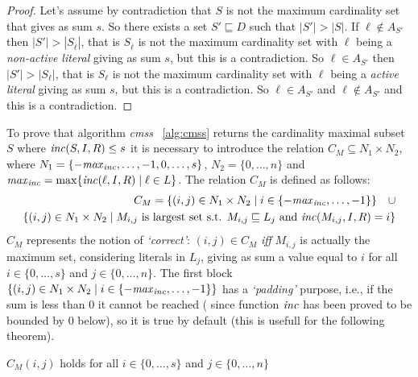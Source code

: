 \begin{proof}
    Let's assume by contradiction that $S$ is not the maximum cardinality set that gives as sum $s$.
    So there exists a set $S' \sqsubseteq D$ such that $|S'| > |S|$.
    If $\ell \not\in A_{S'}$ then $|S'| > |S_{\overline{\ell}}|$, that is $S_{\overline{\ell}}$ 
    is not the maximum cardinality set 
    with $\ell$ being a \textit{non-active literal} giving as sum $s$, but this is a contradiction.
    So $\ell \in A_{S'}$ then $|S'| > |S_{\ell}|$, that is $S_{\ell}$ is not the maximum cardinality set 
    with $\ell$ being a \textit{active literal} giving as sum $s$, but this is a contradiction.
    So $\ell \in A_{S'}$ and $ \ell \not\in A_{S'}$ and this is a contradiction.
\end{proof}



To prove that algorithm \textit{cmss} ~\ref{alg:cmss} returns the cardinality maximal subset $S$ 
where  $\mathit{inc}(S,I,R) \le s$ it is necessary to introduce the
relation $C_M \subseteq N_1 \times N_2$, where $N_1 = \{-\mathit{max}_{\mathit{inc}}, \hdots, -1, 0, \hdots, s\}$,
$N_2 = \{0, \hdots, n\}$ and $\mathit{max}_{\mathit{inc}} = \max \{ \mathit{inc}(\ell,I,R) \mid \ell \in L\}$.
The relation $C_M$ is defined as follows:
\begin{align*}
    C_M = \{ (i,j) \in N_1 \times N_2 \mid i \in \{-\mathit{max}_{\mathit{inc}}, \hdots, -1\}\} \quad  \cup \\
    \{(i,j) \in N_1 \times N_2 \mid M_{i,j} \text{ is largest set s.t. } M_{i,j} \sqsubseteq L_j \text{ and } 
    \mathit{inc}(M_{i,j},I,R) = i\}
\end{align*}
$C_M$ represents the notion of \textit{`correct'}: $(i,j) \in C_M$ \textit{iff}
$M_{i,j}$ is actually the maximum set, considering literals in $L_j$,
giving as sum a value equal to $i$ for all $i \in \{0, \hdots, s\}$
and $j \in \{0, \hdots, n\}$.
The first block $\{ (i,j) \in N_1 \times N_2 \mid i \in \{-\mathit{max}_{\mathit{inc}}, \hdots, -1\}\}$
has a \textit{`padding'} purpose, i.e., if the sum is less than 0 it cannot be reached ( since function $\mathit{inc}$
has been proved to be bounded by 0 below), so it is true by default (this is usefull for the following
theorem).

\begin{theorem}
    \label{thereom:inductive:cmin}
    $C_M(i,j)$ holds for all $i \in \{0, \hdots, s\}$
    and $j \in \{0, \hdots, n\}$
\end{theorem}

